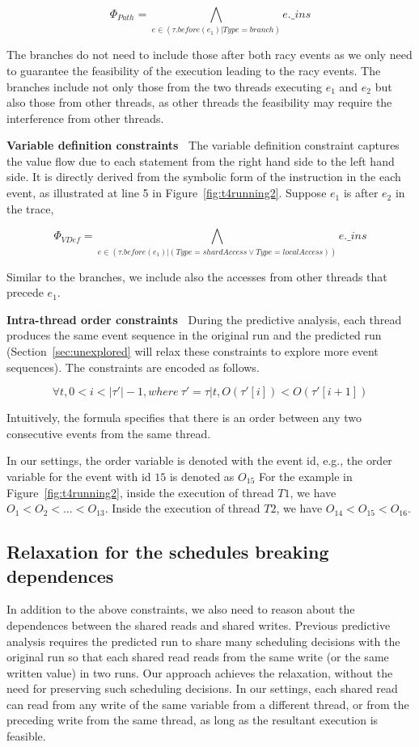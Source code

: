 $$
\Phi_{Path}=\bigwedge_{e\in (\tau.before(e_1)|Type=branch)} e.\_ins 
$$

The branches do not need to include those after both racy events as we only need to guarantee the feasibility of the  execution leading to the racy events.
The branches include not only those from the two threads executing $e_1$ and $e_2$ but also those from other threads, as other threads the feasibility may require the interference from other threads.
 




{\bf Variable definition constraints\ } The variable definition constraint captures the value flow due to each statement from the right hand side to the left hand side. It is directly derived from the symbolic form of the instruction in the each event, as illustrated at line 5 in Figure~\ref{fig:t4running2}.
Suppose $e_1$ is after $e_2$ in the trace,

 $$
\Phi_{VDef}=\bigwedge_{e\in (\tau.before(e_1)|(Type=shardAccess\vee Type=localAccess))} e.\_ins 
$$

Similar to the branches, we include also the accesses from other threads that precede $e_1$.



{\bf Intra-thread order constraints\ } During the predictive analysis, each thread produces the same event sequence in the original run and the predicted run (Section~\ref{sec:unexplored} will relax these constraints to explore more event sequences).  
The constraints are encoded as follows. 

$$
\forall t,  0<i<|\tau'|-1, where\  \tau'=\tau|t, O(\tau'[i])<O(\tau'[i+1])
$$

  
Intuitively, the formula specifies that there is an order between any two consecutive events from the same thread. 

 In our settings, the order variable is denoted with the event id, e.g., the order variable for the event with id $15$ is denoted as $O_{15}$
For the example in Figure~\ref{fig:t4running2}, inside the execution of thread $T1$, we have $O_1<O_2 < \dots < O_{13}$. 
Inside the execution of thread $T2$, we have $O_{14}<O_{15}<O_{16}$.


\subsection{Relaxation for the schedules breaking dependences}
In addition to the above constraints, we also need to reason about the dependences between the shared reads and shared writes. 
 Previous predictive analysis requires the predicted run to share many scheduling decisions with the original run so that each shared read reads from the same write (or the same written value) in two runs. Our approach achieves the relaxation, without the need for preserving such scheduling decisions. In our settings, each shared read can read from any write of the same variable from a different thread, or from the preceding write from the same thread, as long as the resultant execution is feasible.
 

